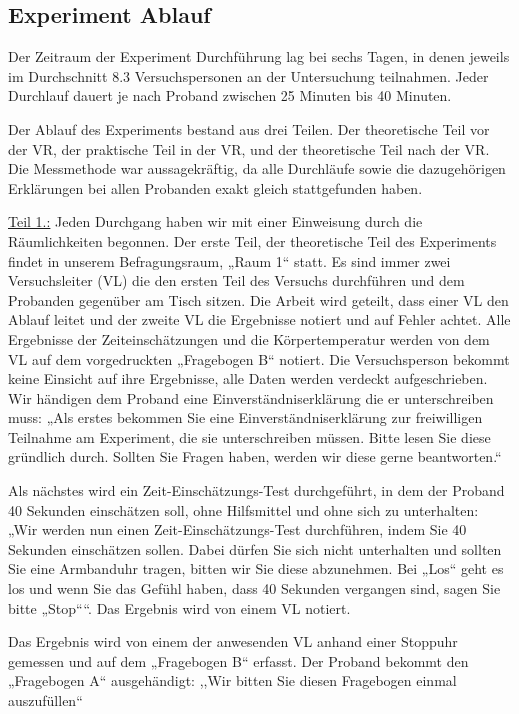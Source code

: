 \documentclass{Bericht}
\begin{document}
\subsection{Experiment Ablauf}
Der Zeitraum der Experiment Durchführung lag bei sechs Tagen, in denen jeweils im Durchschnitt
8.3 Versuchspersonen an der Untersuchung teilnahmen. Jeder Durchlauf dauert je nach
Proband zwischen 25 Minuten bis 40 Minuten.
\par
Der Ablauf des Experiments bestand aus drei Teilen. Der theoretische Teil vor der VR, der praktische
Teil in der VR, und der theoretische Teil nach der VR. Die Messmethode war aussagekräftig,
da alle Durchläufe sowie die dazugehörigen Erklärungen bei allen Probanden exakt
gleich stattgefunden haben.
\par
\underline{Teil 1.:}
Jeden Durchgang haben wir mit einer Einweisung durch die Räumlichkeiten begonnen. Der erste
Teil, der theoretische Teil des Experiments findet in unserem Befragungsraum, „Raum 1“
statt. Es sind immer zwei Versuchsleiter (VL) die den ersten Teil des Versuchs durchführen und
dem Probanden gegenüber am Tisch sitzen. Die Arbeit wird geteilt, dass einer VL den Ablauf
leitet und der zweite VL die Ergebnisse notiert und auf Fehler achtet. Alle Ergebnisse der Zeiteinschätzungen
und die Körpertemperatur werden von dem VL auf dem vorgedruckten „Fragebogen
B“ notiert. Die Versuchsperson bekommt keine Einsicht auf ihre Ergebnisse, alle Daten
werden verdeckt aufgeschrieben.
Wir händigen dem Proband eine Einverständniserklärung die er unterschreiben muss:
„Als erstes bekommen Sie eine Einverständniserklärung zur freiwilligen Teilnahme am Experiment,
die sie unterschreiben müssen. Bitte lesen Sie diese gründlich durch. Sollten Sie Fragen
haben, werden wir diese gerne beantworten.“
\par
Als nächstes wird ein Zeit-Einschätzungs-Test durchgeführt, in dem der Proband 40 Sekunden
einschätzen soll, ohne Hilfsmittel und ohne sich zu unterhalten:
„Wir werden nun einen Zeit-Einschätzungs-Test durchführen, indem Sie 40 Sekunden einschätzen
sollen. Dabei dürfen Sie sich nicht unterhalten und sollten Sie eine Armbanduhr tragen,
bitten wir Sie diese abzunehmen. Bei „Los“ geht es los und wenn Sie das Gefühl haben,
dass 40 Sekunden vergangen sind, sagen Sie bitte „Stop““. Das Ergebnis wird von einem VL
notiert.
\par
Das Ergebnis wird von einem der anwesenden VL anhand einer Stoppuhr gemessen und auf
dem „Fragebogen B“ erfasst. Der Proband bekommt den „Fragebogen A“ ausgehändigt:
,,Wir bitten Sie diesen Fragebogen einmal auszufüllen“
\end{document}
